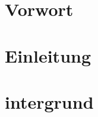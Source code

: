 \documentclass{scrbook}
\begin{document}
\begin{multicols}{2}
\section{Vorwort}
\lipsum[1]
\section{Einleitung}
\lipsum[2]

\columnbreak

\section{intergrund}
\lipsum[3]
\end{multicols}
\end{document}
